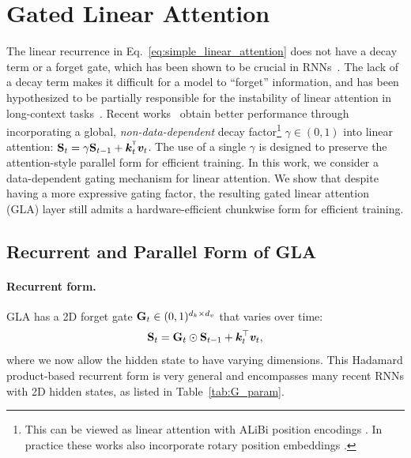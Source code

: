 \vspace{-2mm}
\section{Gated Linear Attention}
\vspace{-2mm}
\label{sec:gla}




The linear recurrence in Eq.~\ref{eq:simple_linear_attention} does not have a decay term or a forget gate, which has been shown to be crucial in RNNs~\citep{HochSchm97,cho2014learning,unreasonable-forget-gate}. The lack of a decay term makes it difficult for a model to ``forget'' information, and has been hypothesized to be partially responsible for the instability of linear attention in long-context tasks~\citep{buckman2024}. Recent works~\citep{sun2023retentive,qin2023scaling} obtain better performance through incorporating a global, \emph{non-data-dependent}  decay factor\footnote{This can be viewed as linear attention with  ALiBi position encodings \cite{alibi2021}.
In practice these works also incorporate  rotary position embeddings \citep[RoPE;][]{rope}.}
$\gamma \in (0, 1)$ into linear attention:
$ \rmS_t = \gamma \rmS_{t-1} + \vk_t^\intercal \vv_t$.
The use of a single $\gamma$ is designed to preserve the attention-style parallel form for efficient training. 
In this work, we consider a data-dependent gating mechanism for linear attention. We show that despite having a more expressive gating factor, the resulting gated linear attention (GLA) layer still admits a hardware-efficient chunkwise form for efficient training.


\vspace{-2mm}
\subsection{Recurrent and Parallel Form of GLA}
\vspace{-2mm}
\label{ssec:gla}


\paragraph{Recurrent form.} GLA has a 2D forget gate \({\mathbf{G}}_t \in (0,1)^{d_k \times d_v}\) that varies over time:
\[
{\mathbf{S}}_t = {\mathbf{G}}_t \odot {\mathbf{S}}_{t-1} + {\bm{k}}_t^{\top} {\bm{v}}_t,
\]
where we now allow the hidden state to have varying dimensions.
This Hadamard product-based  recurrent form is very general and encompasses many recent RNNs with 2D hidden states, as listed in Table~\ref{tab:G_param}. 

